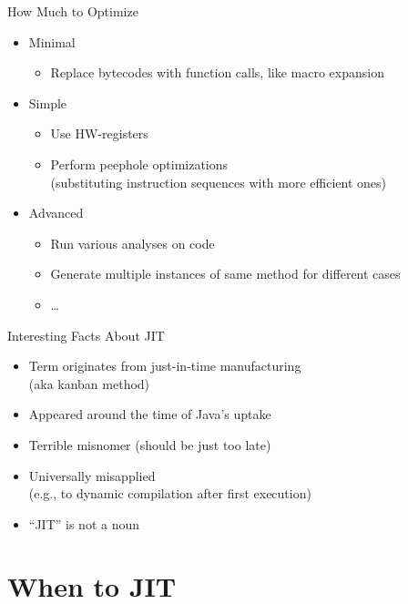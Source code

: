 \documentclass[
14pt,
aspectratio=169,
usenames,
dvipsnames,
x11names]{beamer}
\begin{document}
\begin{frame}{How Much to Optimize}
  \begin{itemize}  \setlength{\itemsep}{\fill}
  \item Minimal
    \begin{itemize}
    \item Replace bytecodes with function calls, like macro expansion
    \end{itemize}
  \item Simple
    \begin{itemize}
    \item Use HW-registers
    \item Perform \alert{peephole} optimizations\\
      (substituting instruction sequences with more efficient ones)
    \end{itemize}
  \item Advanced
    \begin{itemize}
    \item Run various analyses on code
    \item Generate multiple instances of same method for different cases
    \item \ldots
    \end{itemize}
  \end{itemize}
\end{frame}

\begin{frame}{Interesting Facts About JIT}
  \begin{itemize}  \setlength{\itemsep}{\fill}
  \item Term originates from just-in-time manufacturing\\
    (aka kanban method)
  \item Appeared around the time of Java’s uptake
  \item Terrible misnomer (should be \alert{just too late})
  \item Universally misapplied\\
    (e.g., to dynamic compilation \alert{after} first execution)
  \item ``JIT'' is \alert{not a noun}
  \end{itemize}
\end{frame}

\section{When to JIT}
\end{document}
